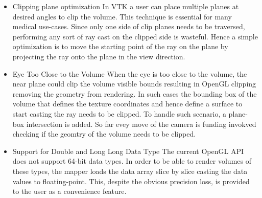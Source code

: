 \begin{itemize}
\item Clipping plane optimization 
In VTK a user can place multiple planes at desired angles to clip the volume. This technique is essential for many medical use-cases. Since only one side of clip planes needs to be traversed, performing any sort of ray cast on the clipped side is wasteful. Hence a simple optimization is to move the starting point of the ray on the plane by projecting the ray onto the plane in the view direction. 

\item Eye Too Close to the Volume
When the eye is too close to the volume, the near plane could clip the volume visible bounds resulting in OpenGL clipping removing the geometry from rendering. In such cases the bounding box of the volume that defines the texture coordinates and hence define a surface to start casting the ray needs to be clipped. To handle such scenario, a plane-box intersection is added. So far evey move of the camera is funding invokved checking if the geomtry of the volume needs to be clipped.

\item Support for Double and Long Long Data Type
The current OpenGL API does not support 64-bit data types. In order to be able to render volumes of these types, the mapper loads the data array slice by slice casting the data values to floating-point. This, despite the obvious precision loss, is provided to the user as a convenience feature.

\end{itemize}
